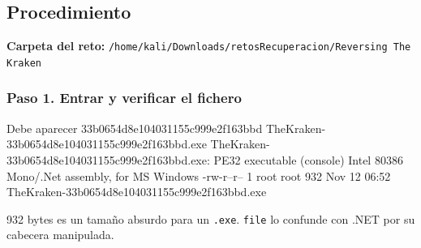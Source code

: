 \documentclass[11pt,a4paper]{article}
\begin{document}
\subsection{Procedimiento}

\noindent\textbf{Carpeta del reto:} \texttt{/\allowbreak{}home/\allowbreak{}kali/\allowbreak{}Downloads/\allowbreak{}retosRecuperacion/\allowbreak{}Reversing The Kraken}


\subsubsection*{Paso 1. Entrar y verificar el fichero}
\begin{salida}{Debe aparecer}
33b0654d8e104031155c999e2f163bbd  TheKraken-33b0654d8e104031155c999e2f163bbd.exe
TheKraken-33b0654d8e104031155c999e2f163bbd.exe: PE32 executable (console) Intel 80386 Mono/.Net assembly, for MS Windows
-rw-r--r-- 1 root root 932 Nov 12 06:52 TheKraken-33b0654d8e104031155c999e2f163bbd.exe
\end{salida}
\begin{nota}932 bytes es un tamaño absurdo para un \texttt{.exe}. \texttt{file} lo confunde con .NET por su cabecera manipulada.\end{nota}
\end{document}
